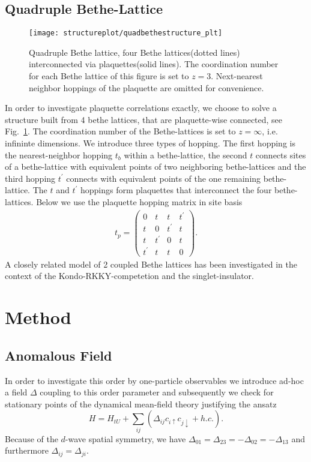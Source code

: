 \documentclass[aps,prb,twocolumn,groupedaddress,amsmath,amssymb]{revtex4-1}
\newcommand{\up}{\uparrow}
\newcommand{\dn}{\downarrow}
\newcommand{\reffig}[1]{Fig.~\ref{#1}}
\begin{document}
\subsection{Quadruple Bethe-Lattice}
\begin{figure}[th]
  \texttt{[image: structureplot/quadbethestructure\_plt]}
  \caption{Quadruple Bethe lattice, four Bethe lattices(dotted lines) interconnected via plaquettes(solid lines). The coordination number for each Bethe lattice of this figure is set to $z=3$. Next-nearest neighbor hoppings of the plaquette are omitted for convenience.}
  \label{fig:structure}
\end{figure}
In order to investigate plaquette correlations exactly, we choose to solve a structure built from 4 bethe lattices, that are plaquette-wise connected, see \reffig{fig:structure}. The coordination number of the Bethe-lattices is set to $z=\infty$, i.e. infininte dimensions. We introduce three types of hopping. The first hopping is the nearest-neighbor hopping $t_b$ within a bethe-lattice, the second $t$ connects sites of a bethe-lattice with equivalent points of two neighboring bethe-lattices and the third hopping $t^\prime$ connects with equivalent points of the one remaining bethe-lattice. The $t$ and $t^\prime$ hoppings form plaquettes that interconnect the four bethe-lattices. Below we use the plaquette hopping matrix in site basis
\begin{align}
  t_p =
  \begin{pmatrix}
    0&t&t&t^\prime\\
    t&0&t^\prime&t\\
    t&t^\prime&0&t\\
    t^\prime&t&t&0
  \end{pmatrix}.
\end{align}
A closely related model of 2 coupled Bethe lattices has been investigated in the context of the Kondo-RKKY-competetion\cite{Moeller1999} and the singlet-insulator\cite{Hafermann2009}.

\section{Method}
\subsection{Anomalous Field}
In order to investigate this order by one-particle observables we introduce ad-hoc a field $\Delta$ coupling to this order parameter and subsequently we check for stationary points of the dynamical mean-field theory justifying the ansatz
\begin{equation}
  \label{eq:hamiltonian}
  H = H_{tU}+\sum_{ij}(\Delta_{ij} c_{i\up} c_{j\dn} + h.c.).
\end{equation}
Because of the $d$-wave spatial symmetry, we have $\Delta_{01}=\Delta_{23} =-\Delta_{02} =-\Delta_{13}$ and furthermore $\Delta_{ij} = \Delta_{ji}$.
\end{document}
